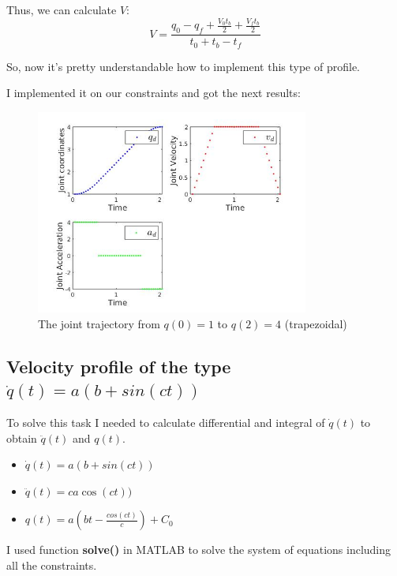 \documentclass[12pt, a4paper]{report}
\begin{document}
Thus, we can calculate $V$:
\begin{equation}
	V = \frac{q_0-q_f+\frac{V_0t_b}{2}+\frac{V_ft_b}{2}}{t_0+t_b-t_f}
\end{equation}

So, now it's pretty understandable how to implement this type of profile. 

I implemented it on our constraints and got the next results:

\begin{figure}[H]
	\centering
		\includegraphics[width=0.8\textwidth]{12} %
	\caption{The joint trajectory from $q(0) = 1$ to $q(2) = 4$ (trapezoidal)} %
	\label{fig:mesh3}
\end{figure}

{\centering
\subsection*{Velocity profile of the type $\dot{q}(t) = a(b + sin(ct))$}
}
%

To solve this task I needed to calculate differential and integral of $\dot{q}(t)$ to obtain $\ddot{q}(t)$ and $q(t)$.
\begin{itemize}
	\item $\dot{q}(t) = a(b + sin(ct))$
	\item $\ddot{q}(t) = ca\cos(ct))$
	\item $q(t) = a(bt - \frac{cos(ct)}{c})+C_0$
	
\end{itemize}

I used function \textbf{solve()} in MATLAB to solve the system of equations including all the constraints.
\end{document}
